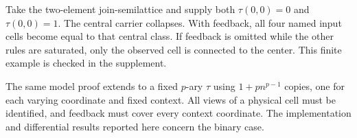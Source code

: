 \begin{example}\label{ex:feedback}
Take the two-element join-semilattice and supply both $\tau(0,0)=0$ and $\tau(0,0)=1$. The central carrier collapses. With feedback, all four named input cells become equal to that central class. If feedback is omitted while the other rules are saturated, only the observed cell is connected to the center. This finite example is checked in the supplement.
\end{example}

The same model proof extends to a fixed $p$-ary $\tau$ using $1+p n^{p-1}$ copies, one for each varying coordinate and fixed context. All views of a physical cell must be identified, and feedback must cover every context coordinate. The implementation and differential results reported here concern the binary case.
